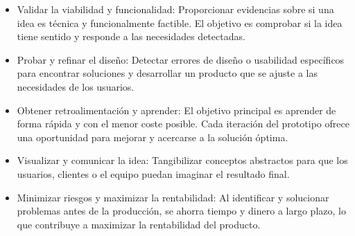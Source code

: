 \begin{itemize}
  \item Validar la viabilidad y funcionalidad: Proporcionar
    evidencias sobre si una idea es técnica y funcionalmente
    factible. El objetivo es comprobar si la idea tiene sentido y
    responde a las necesidades detectadas.

  \item Probar y refinar el diseño: Detectar errores de diseño o
    usabilidad específicos para encontrar soluciones y desarrollar un
    producto que se ajuste a las necesidades de los usuarios.

  \item Obtener retroalimentación y aprender: El objetivo principal
    es aprender de forma rápida y con el menor coste posible. Cada
    iteración del prototipo ofrece una oportunidad para mejorar y
    acercarse a la solución óptima.

  \item Visualizar y comunicar la idea: Tangibilizar conceptos
    abstractos para que los usuarios, clientes o el equipo puedan
    imaginar el resultado final.

  \item Minimizar riesgos y maximizar la rentabilidad: Al identificar
    y solucionar problemas antes de la producción, se ahorra tiempo y
    dinero a largo plazo, lo que contribuye a maximizar la
    rentabilidad del producto.
\end{itemize}

